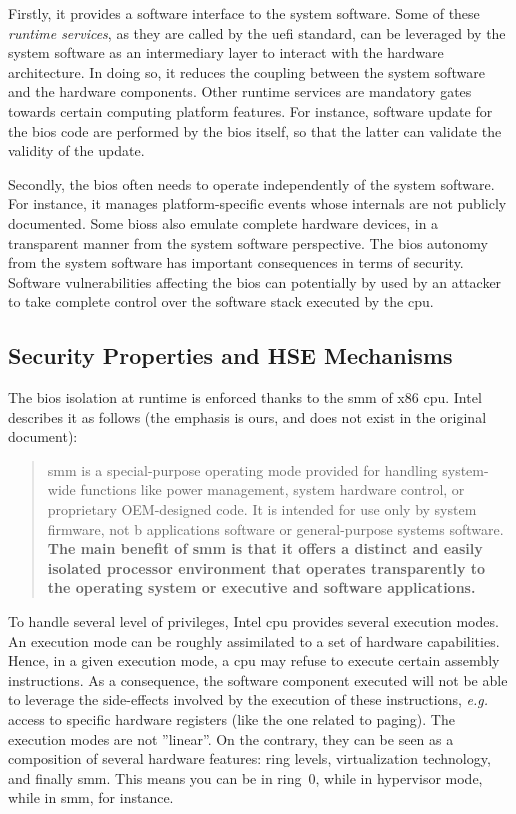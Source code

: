Firstly, it provides a software interface to the system software.
%
Some of these \emph{runtime services}, as they are called by the \ac{uefi}
standard, can be leveraged by the system software as an intermediary layer to
interact with the hardware architecture.
%
In doing so, it reduces the coupling between the system software and the
hardware components.
%
Other runtime services are mandatory gates towards certain computing platform
features.
%
For instance, software update for the \ac{bios} code are performed by the
\ac{bios} itself, so that the latter can validate the validity of the update.

Secondly, the \ac{bios} often needs to operate independently of the system
software.
%
For instance, it manages platform-specific events whose internals are not
publicly documented.
%
Some \acp{bios} also emulate complete hardware devices, in a transparent manner
from the system software perspective.
%
The \ac{bios} autonomy from the system software has important consequences in
terms of security.
%
Software vulnerabilities affecting the \ac{bios} can potentially by used by an
attacker to take complete control over the software stack executed by the
\ac{cpu}.

\subsection{Security Properties and HSE Mechanisms}
\label{subsec:usecase:firm:hse}

The \ac{bios} isolation at runtime is enforced thanks to the \ac{smm} of x86
\ac{cpu}.
%
Intel describes it as follows (the emphasis is ours, and does not exist in the
original document):

\begin{quote}
  \ac{smm} is a special-purpose operating mode provided for handling system-wide
  functions like power management, system hardware control, or proprietary
  OEM-designed code.
  It is intended for use only by system firmware, not b applications software or
  general-purpose systems software.
  \textbf{The main benefit of \ac{smm} is that it offers a distinct and easily
    isolated processor environment that operates transparently to the operating
    system or executive and software applications.}
\end{quote}

To handle several level of privileges, Intel \ac{cpu} provides several execution
modes.
%
An execution mode can be roughly assimilated to a set of hardware capabilities.
%
Hence, in a given execution mode, a \ac{cpu} may refuse to execute certain
assembly instructions.
%
As a consequence, the software component executed will not be able to leverage
the side-effects involved by the execution of these instructions, \emph{e.g.}
access to specific hardware registers (like the one related to paging).
%
The execution modes are not ''linear''.
%
On the contrary, they can be seen as a composition of several hardware features:
ring levels, virtualization technology, and finally \ac{smm}.
%
This means you can be in ring~0, while in hypervisor mode, while in \ac{smm},
for instance.

